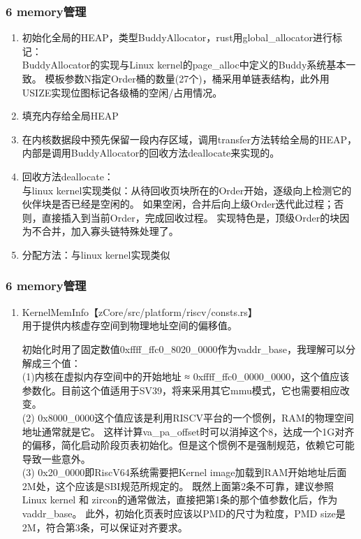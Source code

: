 \documentclass[
8pt, %
]{beamer}
\begin{document}
	\begin{frame}
		\frametitle{6 memory管理}
		\begin{enumerate}
			\item 初始化全局的HEAP，类型BuddyAllocator，rust用global\_allocator进行标记：\\
			BuddyAllocator的实现与Linux kernel的page\_alloc中定义的Buddy系统基本一致。
			模板参数N指定Order桶的数量(27个)，桶采用单链表结构，此外用USIZE实现位图标记各级桶的空闲/占用情况。
			\item 填充内存给全局HEAP
			\item 在内核数据段中预先保留一段内存区域，调用transfer方法转给全局的HEAP，内部是调用BuddyAllocator的回收方法deallocate来实现的。
			\item 回收方法deallocate：\\
			与linux kernel实现类似：从待回收页块所在的Order开始，逐级向上检测它的伙伴块是否已经是空闲的。
			如果空闲，合并后向上级Order迭代此过程；否则，直接插入到当前Order，完成回收过程。
			实现特色是，顶级Order的块因为不合并，加入寡头链特殊处理了。
			\item 分配方法：与linux kernel实现类似
		\end{enumerate}
	\end{frame}

	\begin{frame}
		\frametitle{6 memory管理}
		\begin{enumerate}
			\item KernelMemInfo【zCore/src/platform/riscv/consts.rs】\\
			用于提供内核虚存空间到物理地址空间的偏移值。
			\begin{block}{}
				初始化时用了固定数值0xffff\_ffc0\_8020\_0000作为vaddr\_base，我理解可以分解成三个值：\\
				(1)内核在虚拟内存空间中的开始地址 ≈ 0xffff\_ffc0\_0000\_0000，这个值应该参数化。目前这个值适用于SV39，将来采用其它mmu模式，它也需要相应改变。\\
				(2) 0x8000\_0000这个值应该是利用RISCV平台的一个惯例，RAM的物理空间地址通常就是它。
				这样计算va\_pa\_offset时可以消掉这个8，达成一个1G对齐的偏移，简化启动阶段页表初始化。但是这个惯例不是强制规范，依赖它可能导致一些意外。\\
				(3) 0x20\_0000即RiscV64系统需要把Kernel image加载到RAM开始地址后面2M处，这个应该是SBI规范所规定的。
				既然上面第2条不可靠，建议参照Linux kernel 和 zircon的通常做法，直接把第1条的那个值参数化后，作为vaddr\_base。
				此外，初始化页表时应该以PMD的尺寸为粒度，PMD size是2M，符合第3条，可以保证对齐要求。
			\end{block}
		\end{enumerate}
	\end{frame}
\end{document}
